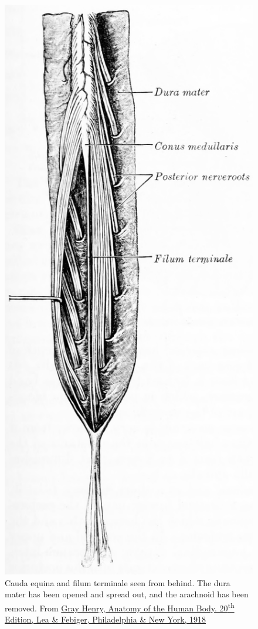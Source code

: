 \begin{figure}

{\centering \includegraphics[width=0.7\linewidth]{./figures/cns/GrayAnat1918p751a} 

}

\caption{Cauda equina and filum terminale seen from behind. The dura mater has been opened and spread out, and the arachnoid has been removed. From \href{https://archive.org/details/anatomyofhumanbo1918gray/page/n6/mode/2up}{Gray Henry, Anatomy of the Human Body. 20\textsuperscript{th} Edition, Lea \& Febiger, Philadelphia \& New York, 1918}}\label{fig:caudaequina}
\end{figure}

